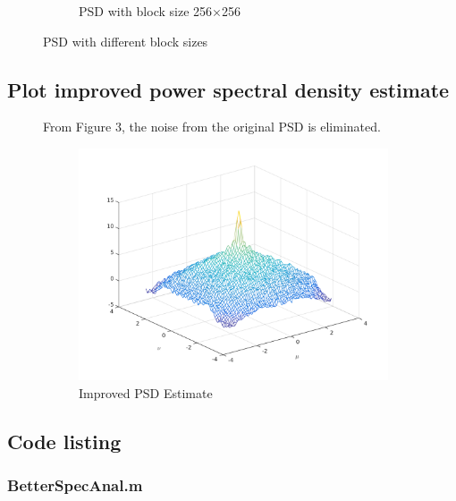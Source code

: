 \documentclass{article}
\begin{document}
\begin{description}
\begin{figure}[h]
\begin{subfigure}{1.0\textwidth}
				\caption{PSD with block size 256$\times$256}
			\end{subfigure}
			\caption{PSD with different block sizes}
		\end{figure}
	\end{description}

\pagebreak

\subsection{Plot improved power spectral density estimate}
	\begin{description}
	\item[]
	From Figure 3, the noise from the original PSD is eliminated.
		\begin{figure}[h]
			\begin{center}
				\includegraphics[width=0.9\textwidth]{psd_better.png}
				\caption{Improved PSD Estimate}
			\end{center}
		\end{figure}
	\end{description}

\subsection{Code listing}
	\subsubsection{BetterSpecAnal.m}
		\inputminted[tabsize=4,breaklines]{matlab}{BetterSpecAnal.m}

\end{document}
